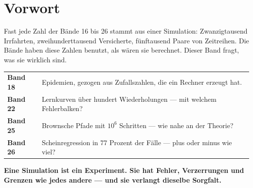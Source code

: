 \chapter*{Vorwort}

\begin{merksatz}
Fast jede Zahl der Bände 16 bis 26 stammt aus einer Simulation: Zwanzigtausend Irrfahrten, zweihunderttausend Versicherte, fünftausend Paare von Zeitreihen. Die Bände haben diese Zahlen benutzt, als wären sie berechnet. Dieser Band fragt, was sie wirklich sind.

\begin{center}
{\small
\renewcommand{\arraystretch}{1.5}
\begin{tabular}{@{}P{2.2cm}P{6.4cm}@{}}
\toprule
\textbf{Band 18} & Epidemien, gezogen aus Zufallszahlen, die ein Rechner erzeugt hat.\\
\textbf{Band 22} & Lernkurven über hundert Wiederholungen --- mit welchem Fehlerbalken?\\
\textbf{Band 25} & Brownsche Pfade mit $10^{6}$ Schritten --- wie nahe an der Theorie?\\
\textbf{Band 26} & Scheinregression in $77$ Prozent der Fälle --- plus oder minus wie viel?\\
\bottomrule
\end{tabular}}
\end{center}

\begin{center}
\begin{minipage}{0.9\textwidth}
\textbf{Eine Simulation ist ein Experiment. Sie hat Fehler, Verzerrungen und Grenzen wie jedes andere --- und sie verlangt dieselbe Sorgfalt.}
\end{minipage}
\end{center}
\end{merksatz}

